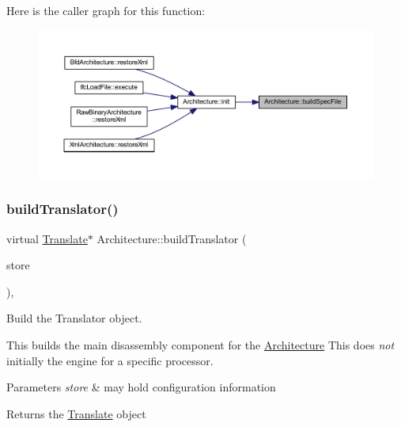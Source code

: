 Here is the caller graph for this function\+:
\nopagebreak
\begin{figure}[H]
\begin{center}
\leavevmode
\includegraphics[width=350pt]{class_architecture_ad9e8edfa21e63d4b37b8003397804933_icgraph}
\end{center}
\end{figure}
\mbox{\label{class_architecture_ab951056481cac3e73770db9d567d5212}} 
\subsubsection{\texorpdfstring{buildTranslator()}{buildTranslator()}}
{\footnotesize\ttfamily virtual \mbox{\hyperlink{class_translate}{Translate}}$\ast$ Architecture\+::build\+Translator (\begin{DoxyParamCaption}\item[{\mbox{\hyperlink{class_document_storage}{Document\+Storage}} \&}]{store }\end{DoxyParamCaption})\hspace{0.3cm}{\ttfamily [protected]}, {}}



Build the Translator object. 

This builds the main disassembly component for the \mbox{\hyperlink{class_architecture}{Architecture}} This does {\itshape not} initially the engine for a specific processor. 
\begin{DoxyParams}{Parameters}
{\em store} & may hold configuration information \\
\hline
\end{DoxyParams}
\begin{DoxyReturn}{Returns}
the \mbox{\hyperlink{class_translate}{Translate}} object 
\end{DoxyReturn}


